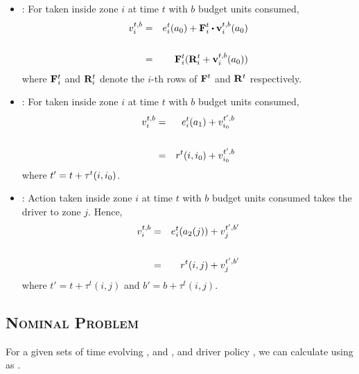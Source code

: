\begin{itemize}
	\item {\getpassenger} : For {\getpassengeraction} taken inside zone $i$ at time $t$ with $b$ budget units consumed,
	\begin{eqnarray}
	\cumulativeearning{i}{t,b} &=& \actionearning{i}{t}{\getpassengeraction} + \empiricaltransitionmatrix_{i}^{t} \bigcdot \inducedearningvector{i}{t,b}{\getpassengeraction} \\
	\nonumber\\
	&=& \empiricaltransitionmatrix_{i}^{t} (\rewardsmatrix_{i}^{t} + \inducedearningvector{i}{t,b}{\getpassengeraction}) \label{eq:cumulative_earning_get_passenger}
	\end{eqnarray}
	where ${\mathbf{F}}_{i}^{t}$ and ${\mathbf{R}}_{i}^{t}$ denote the $i$-th rows of ${\mathbf{F}}^{t}$ and ${\mathbf{R}}^{t}$ respectively. \\

	\item {\gohome} : For {\gohomeaction} taken inside zone $i$ at time $t$ with $b$ budget units consumed,
	\begin{eqnarray}
	v_{i}^{t,b} &=& e_{i}^{t}({a_1}) + v_{{i_0}}^{t',b} \\
	\nonumber\\
	&=& r^t(i,{i_0}) + v_{{i_0}}^{t',b} 
	\end{eqnarray}
	where $t' = t + \tau^t(i,{i_0})$. \\

	\item {\relocate} : Action {\relocateaction} taken inside zone $i$ at time $t$ with $b$ budget units consumed takes the driver to zone $j$.
	Hence,
	\begin{eqnarray}
	v_{i}^{t,b} &=& e_{i}^{t}({a_2(j)}) + v_{j}^{t',b'} \\
	\nonumber \\
	&=& r^t(i,j) + v_{j}^{t',b'}
	\end{eqnarray}
	where $t' = t + \tau^t(i,j)$ and $b' = b + \tau^t(i,j)$. 
\end{itemize}
\fi
\subsection{\textsc{Nominal Problem}}
For a given sets of time evolving {\empiricaltransitionmatrix}, {\traveltimematrix} and {\rewardsmatrix}, and driver policy \policy, we can calculate {\totalexpectedearnings} using as {}.

